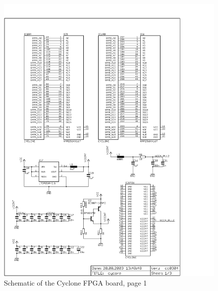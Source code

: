 \begin{figure}
    \centering
    \includegraphics[scale=0.68]{appendix/cycore_p1}
    \caption{Schematic of the Cyclone FPGA board, page 1}
\end{figure}
